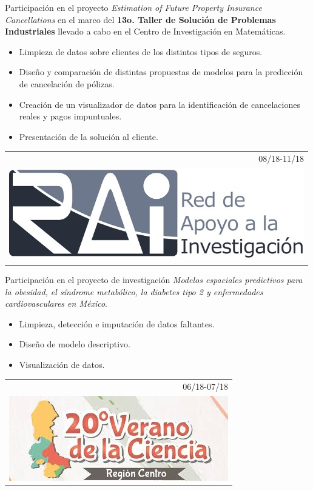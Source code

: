 \documentclass[]{friggeri-cv}
\begin{document}
\begin{entrylist}
{\begin{tabular}{r}
	\end{tabular}
    }
    {\vspace{-0.91cm}}
    { }
    {Participación en el proyecto \textsl{Estimation of Future Property Insurance Cancellations} en el marco del \textbf{13o. Taller de Solución de Problemas Industriales} llevado a cabo en el Centro de Investigación en Matemáticas.
    \begin{itemize}
	\item Limpieza de datos sobre clientes de los distintos tipos de seguros.
	\item Diseño y comparación de distintas propuestas de modelos para la predicción de cancelación de pólizas.
	\item Creación de un visualizador de datos para la identificación de cancelaciones reales y pagos impuntuales.
	\item Presentación de la solución al cliente.
    \end{itemize}}
\entry
   {   \begin{tabular}{r}
    		08/18-11/18\\
     		\includegraphics[scale=0.15]{img/RAI.jpg}
	\end{tabular}
    }
    {\vspace{-0.95cm}}
    { }
    {Participación en el proyecto de investigación \textsl{Modelos espaciales predictivos para la obesidad, el síndrome metabólico, la diabetes tipo 2 y enfermedades cardiovasculares en México}.
    \begin{itemize}
	\item Limpieza, detección e imputación de datos faltantes.
	\item Diseño de modelo descriptivo.
	\item Visualización de datos.
\end{itemize}}
  \entry
    {\begin{tabular}{r}
    		06/18-07/18\\
     		\includegraphics[scale=0.203]{img/20verano.jpeg}

\end{tabular}}
\end{entrylist}
\end{document}
